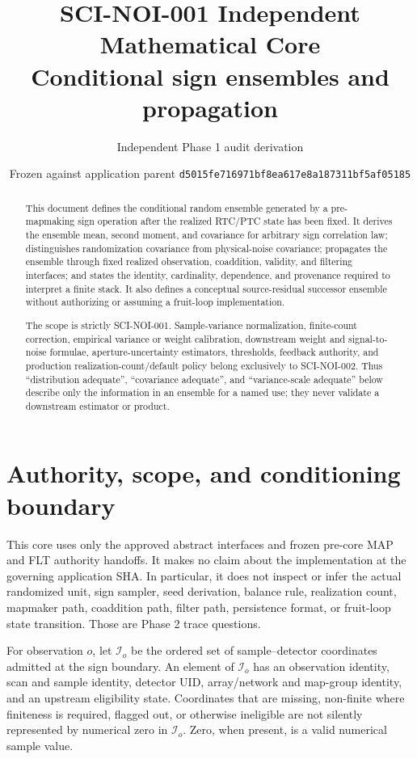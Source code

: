 \documentclass[11pt]{article}
\title{SCI-NOI-001 Independent Mathematical Core\\
Conditional sign ensembles and propagation}
\author{Independent Phase 1 audit derivation}
\date{Frozen against application parent
\texttt{d5015fe716971bf8ea617e8a187311bf5af05185}}
\begin{document}
\maketitle

\begin{abstract}
This document defines the conditional random ensemble generated by a
pre-mapmaking sign operation after the realized RTC/PTC state has been fixed.
It derives the ensemble mean, second moment, and covariance for arbitrary sign
correlation law; distinguishes randomization covariance from physical-noise
covariance; propagates the ensemble through fixed realized observation,
coaddition, validity, and filtering interfaces; and states the identity,
cardinality, dependence, and provenance required to interpret a finite stack.
It also defines a conceptual source-residual successor ensemble without
authorizing or assuming a fruit-loop implementation.

The scope is strictly SCI-NOI-001.  Sample-variance normalization, finite-count
correction, empirical variance or weight calibration, downstream weight and
signal-to-noise formulae, aperture-uncertainty estimators, thresholds,
feedback authority, and production realization-count/default policy belong
exclusively to SCI-NOI-002.  Thus ``distribution adequate'', ``covariance
adequate'', and ``variance-scale adequate'' below describe only the information
in an ensemble for a named use; they never validate a downstream estimator or
product.
\end{abstract}

\section{Authority, scope, and conditioning boundary}

This core uses only the approved abstract interfaces and frozen pre-core MAP
and FLT authority handoffs.  It makes no claim about the implementation at the
governing application SHA.  In particular, it does not inspect or infer the
actual randomized unit, sign sampler, seed derivation, balance rule,
realization count, mapmaker path, coaddition path, filter path, persistence
format, or fruit-loop state transition.  Those are Phase 2 trace questions.

For observation $o$, let $\mathcal I_o$ be the ordered set of sample--detector
coordinates admitted at the sign boundary.  An element of $\mathcal I_o$ has
an observation identity, scan and sample identity, detector UID, array/network
and map-group identity, and an upstream eligibility state.  Coordinates that
are missing, non-finite where finiteness is required, flagged out, or otherwise
ineligible are not silently represented by numerical zero in $\mathcal I_o$.
Zero, when present, is a valid numerical sample value.
\end{document}
